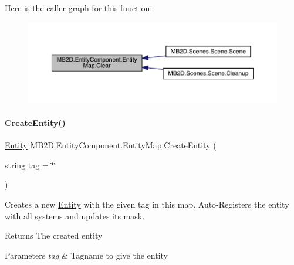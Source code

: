 Here is the caller graph for this function\+:
\nopagebreak
\begin{figure}[H]
\begin{center}
\leavevmode
\includegraphics[width=350pt]{class_m_b2_d_1_1_entity_component_1_1_entity_map_a079e8e957e7fbaa8de73e609ab646fe1_icgraph}
\end{center}
\end{figure}
\hypertarget{class_m_b2_d_1_1_entity_component_1_1_entity_map_a2461bfeb368018daadb2578c445f8fc2}{}\label{class_m_b2_d_1_1_entity_component_1_1_entity_map_a2461bfeb368018daadb2578c445f8fc2} 
\paragraph{\texorpdfstring{Create\+Entity()}{CreateEntity()}}
{\footnotesize\ttfamily \hyperlink{class_m_b2_d_1_1_entity_component_1_1_entity}{Entity} M\+B2\+D.\+Entity\+Component.\+Entity\+Map.\+Create\+Entity (\begin{DoxyParamCaption}\item[{string}]{tag = {\ttfamily \char`\"{}\char`\"{}} }\end{DoxyParamCaption})\hspace{0.3cm}{\ttfamily [inline]}}



Creates a new \hyperlink{class_m_b2_d_1_1_entity_component_1_1_entity}{Entity} with the given tag in this map. Auto-\/\+Registers the entity with all systems and updates its mask. 

\begin{DoxyReturn}{Returns}
The created entity
\end{DoxyReturn}

\begin{DoxyParams}{Parameters}
{\em tag} & Tagname to give the entity\\
\hline
\end{DoxyParams}
\hypertarget{class_m_b2_d_1_1_entity_component_1_1_entity_map_ad0a7991327281d908b72b33bc1944b70}{}\label{class_m_b2_d_1_1_entity_component_1_1_entity_map_ad0a7991327281d908b72b33bc1944b70} 
